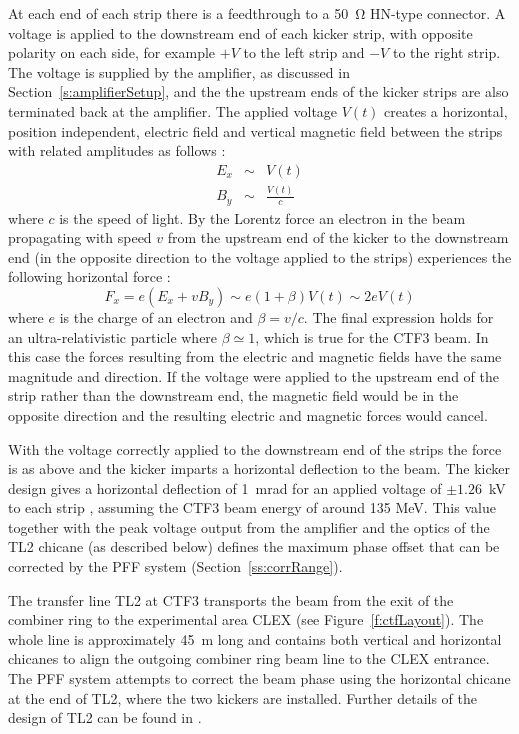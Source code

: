 At each end of each strip there is a feedthrough to a 50~\(\mathrm{\Omega}\) HN-type connector. A voltage is applied to the downstream end of each kicker strip, with opposite polarity on each side, for example \(+V\) to the left strip and \(-V\) to the right strip. The voltage is supplied by the amplifier, as discussed in Section~\ref{s:amplifierSetup}, and the the upstream ends of the kicker strips are also terminated back at the amplifier. The applied voltage \(V(t)\) creates a horizontal, position independent, electric field and vertical magnetic field between the strips with related amplitudes as follows \cite{byrdKicker}:
\begin{eqnarray}
E_x &\sim& V(t) \\
B_y &\sim& \frac{V(t)}{c}
\end{eqnarray}
where \(c\) is the speed of light. By the Lorentz force an electron in the beam propagating with speed \(v\) from the upstream end of the kicker to the downstream end (in the opposite direction to the voltage applied to the strips) experiences the following horizontal force \cite{byrdKicker}:
\begin{equation}
F_x = e(E_x + vB_y) \sim e(1+\beta)V(t) \sim 2eV(t)
\end{equation}
where \(e\) is the charge of an electron and \(\beta = v/c\). The final expression holds for an ultra-relativistic particle where \(\beta \simeq 1\), which is true for the CTF3 beam. In this case the forces resulting from the electric and magnetic fields have the same magnitude and direction. If the voltage were applied to the upstream end of the strip rather than the downstream end, the magnetic field would be in the opposite direction and the resulting electric and magnetic forces would cancel. 

With the voltage correctly applied to the downstream end of the strips the force is as above and the kicker imparts a horizontal deflection to the beam. The kicker design gives a horizontal deflection of 1~mrad for an applied voltage of \(\pm1.26\)~kV to each strip \cite{kickerIPAC11}, assuming the CTF3 beam energy of around 135 MeV. This value together with the peak voltage output from the amplifier and the optics of the TL2 chicane (as described below) defines the maximum phase offset that can be corrected by the PFF system (Section~\ref{ss:corrRange}).




The transfer line TL2 at CTF3 transports the beam from the exit of the combiner ring to the experimental area CLEX (see Figure~\ref{f:ctfLayout}). The whole line is approximately 45~m long and contains both vertical and horizontal chicanes to align the outgoing combiner ring beam line to the CLEX entrance. The PFF system attempts to correct the beam phase using the horizontal chicane at the end of TL2, where the two kickers are installed. Further details of the design of TL2 can be found in \cite{tl2}.

